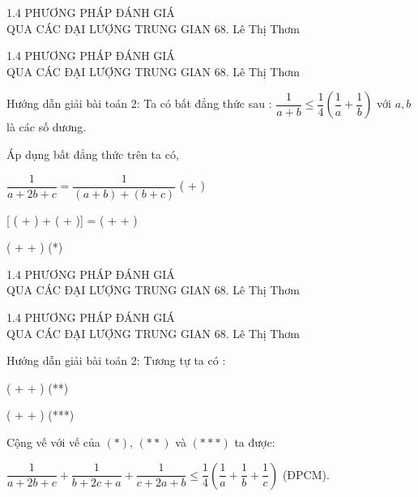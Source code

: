 \begin{frame}{1.4 PHƯƠNG PHÁP ĐÁNH GIÁ\\ QUA CÁC ĐẠI LƯỢNG TRUNG GIAN \hspace{3cm}  68. Lê Thị Thơm} 

 \end{frame}

 \begin{frame}{1.4 PHƯƠNG PHÁP ĐÁNH GIÁ\\ QUA CÁC ĐẠI LƯỢNG TRUNG GIAN \hspace{3cm}  68. Lê Thị Thơm} 
\begin{block}{Hướng dẫn giải bài toán 2:}
 Ta có bất đẳng thức sau : $\dfrac{1}{a + b} \leq \dfrac{1}{4}  ( \dfrac{1}{a} + \dfrac{1}{b})$
 với $a,b $ là các số dương.
 
 Áp dụng bất đẳng thức trên ta có,
 
 $\dfrac{1}{a + 2b + c}= \dfrac{1}{(a+b)+(b+c)}$ \leq {} ( + )
 
 \leq {}[ ( + ) +  ( + )] =  ( +   +  ) 
 
 \implies {} \leq {} ( +   +  ) (*)
 
 \end{block}
 \end{frame}
 \begin{frame}{1.4 PHƯƠNG PHÁP ĐÁNH GIÁ\\ QUA CÁC ĐẠI LƯỢNG TRUNG GIAN \hspace{3cm}  68. Lê Thị Thơm} 

\end{frame}

\begin{frame}{1.4 PHƯƠNG PHÁP ĐÁNH GIÁ\\ QUA CÁC ĐẠI LƯỢNG TRUNG GIAN \hspace{3cm}  68. Lê Thị Thơm} 
\begin{block}{Hướng dẫn giải bài toán 2:}
 Tương tự ta có : 
 
  \leq {} ( +   +  ) (**)
 
  \leq {} ( +   +  ) (***)
 
 Cộng vế với vế của  $(*)$, $(**)$ và $(***)$ ta được: 
 
 $\dfrac{1}{a+2b+c}+\dfrac{1}{b+2c+a}+\dfrac{1}{c + 2a + b}\leq\dfrac{1}{4}(\dfrac{1}{a}+\dfrac{1}{b}+\dfrac{1}{c})$ (ĐPCM).
 
\end{block} 
\end{frame}

